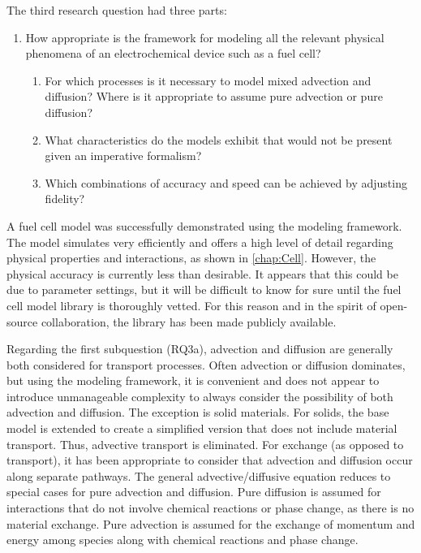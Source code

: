 The third research question had three parts:\nopagebreak
\begin{enumerate}[\bfseries RQ3:]
  \item How appropriate is the framework for modeling all the relevant physical phenomena of an electrochemical device such as a fuel cell?
  \begin{enumerate}[\bfseries a:]
    \item For which processes is it necessary to model mixed advection and diffusion?  Where is it appropriate to assume pure advection or pure diffusion?
    \item What characteristics do the models exhibit that would not be present given an imperative formalism?
    \item Which combinations of accuracy and speed can be achieved by adjusting fidelity?
  \end{enumerate}
\end{enumerate}
A fuel cell model was successfully demonstrated using the modeling framework.  The model simulates very efficiently and offers a high level of detail regarding physical properties and interactions, as shown in \autoref{chap:Cell}.  However, the physical accuracy is currently less than desirable.  It appears that this could be due to parameter settings,  but it will be difficult to know for sure until the fuel cell model library is thoroughly vetted.  For this reason and in the spirit of open-source collaboration, the library has been made publicly available.

Regarding the first subquestion (RQ3a), advection and diffusion are generally both considered for transport processes.  Often advection or diffusion dominates, but using the modeling framework, it is convenient and does not appear to introduce unmanageable complexity to always consider the possibility of both advection and diffusion.  The exception is solid materials.  For solids, the base  model is extended to create a simplified version that does not include material transport.  Thus, advective transport is eliminated.  For exchange (as opposed to transport), it has been appropriate to consider that advection and diffusion occur along separate pathways.  The general advective\slash{}diffusive equation reduces to special cases for pure advection and diffusion.  Pure diffusion is assumed for interactions that do not involve chemical reactions or phase change, as there is no material exchange.  Pure advection is assumed for the exchange of momentum and energy among species along with chemical reactions and phase change.

